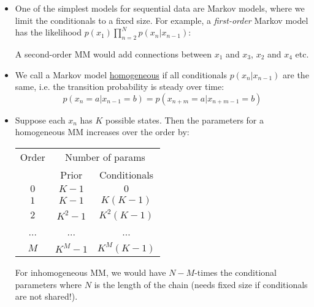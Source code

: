 \begin{itemize}
	\item One of the simplest models for sequential data are Markov models, where we limit the conditionals to a fixed size. For example, a \textit{first-order} Markov model has the likelihood $p(x_1)\prod_{n=2}^{N}p(x_n|x_{n-1})$:
	
	\begin{figure}[ht!]
		\centering
	\end{figure}

	A second-order MM would add connections between $x_1$ and $x_3$, $x_2$ and $x_4$ etc.
	\item We call a Markov model \underline{homogeneous} if all conditionals $p(x_{n}|x_{n-1})$ are the same, i.e. the transition probability is steady over time:
	$$p(x_{n}=a|x_{n-1}=b) = p(x_{n+m}=a|x_{n+m-1}=b)$$
	\item Suppose each $x_n$ has $K$ possible states. Then the parameters for a homogeneous MM increases over the order by:
	\begin{table}[ht!]
		\centering
		\begin{tabular}{c|cc}
			Order & \multicolumn{2}{c}{Number of params}\\
			& Prior & Conditionals\\
			\hline 
			$0$ & $K-1$ & $0$\\
			$1$ & $K-1$ & $K(K-1)$\\
			$2$ & $K^2 - 1$ & $K^2(K-1)$\\
			... & ... & ...\\
			$M$ & $K^{M}-1$ & $K^{M}(K-1)$\\
		\end{tabular}
	\end{table}

	For inhomogeneous MM, we would have $N-M$-times the conditional parameters where $N$ is the length of the chain (needs fixed size if conditionals are not shared!). 
	

\end{itemize}
